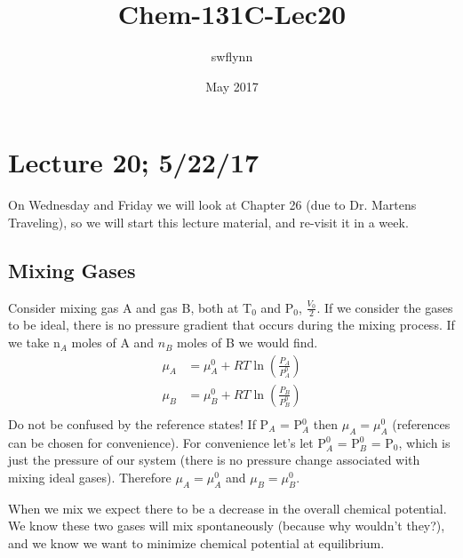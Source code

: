 \documentclass{article}
\title{Chem-131C-Lec20}
\author{swflynn}
\date{May 2017}
\begin{document}
\maketitle

\section*{Lecture 20; 5/22/17}
On Wednesday and Friday we will look at Chapter 26 (due to Dr. Martens Traveling), so we will start this lecture material, and re-visit it in a week. 

\subsection*{Mixing Gases}
Consider mixing gas A and gas B, both at T$_0$ and P$_0$, $\frac{V_0}{2}$. 
If we consider the gases to be ideal, there is no pressure gradient that occurs during the mixing process. 
If we take n$_A$ moles of A and $n_B$ moles of B we would find. 
\begin{equation}
    \begin{split}
        \mu_A &= \mu_A^0 + RT \ln\left(\frac{P_A}{P_A^0}\right)\\
         \mu_B &= \mu_B^0 + RT \ln\left(\frac{P_B}{P_B^0}\right)\\
    \end{split}
\end{equation}
Do not be confused by the reference states!
If P$_A$ = P$_A^0$ then $\mu_A = \mu_A^0$ (references can be chosen for convenience). 
For convenience let's let P$_A^0$ = P$_B^0$ = P$_0$, which is just the pressure of our system (there is no pressure change associated with mixing ideal gases). 
Therefore $\mu_A = \mu_A^0$ and $\mu_B = \mu_B^0$.

When we mix we expect there to be a decrease in the overall chemical potential.
We know these two gases will mix spontaneously (because why wouldn't they?), and we know we want to minimize chemical potential at equilibrium. 
\end{document}
